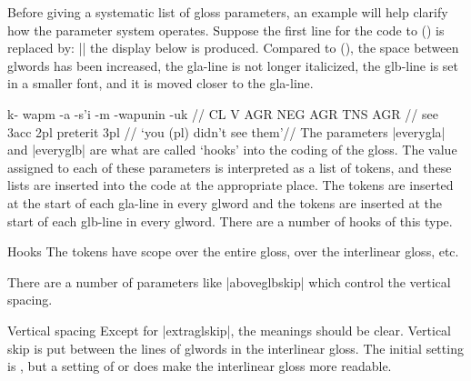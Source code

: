 Before giving a systematic list of gloss parameters, an example
will help clarify how the parameter system operates.  Suppose the
first line for the code to () is replaced by:
\medskip
\noindent |\ex[glspace=1.5em,everygla={},everyglb=\footnotesize,aboveglbskip=-.2ex]|
\medskip
\noindent the display below is produced.  Compared to
(), the space between glwords has been increased, the
gla-line is not longer italicized, the glb-line is set in
a smaller font, and it is moved closer to the gla-line.

\framedisplay
\ex[glspace=1.5em,everygla=,everyglb=\footnotesize,aboveglbskip=-.2ex]
\begingl
\gla k- wapm -a -s'i -m -wapunin -uk //
\glb CL V AGR NEG AGR TNS AGR //
 see {\sc 3acc} {} {\sc 2pl} preterit {\sc 3pl} //
\glft `you (pl) didn't see them'//
\endgl
\xe
\endframedisplay
The parameters |everygla| and |everyglb| are what are called `hooks'
into the coding of the gloss.  The value assigned to each of these
parameters is interpreted as a list of tokens, and these lists are
inserted into the code at the appropriate place.  The tokens
 are inserted at the start of each gla-line in
every glword and the tokens  are inserted at the
start of each glb-line in every glword.  There are a number of hooks
of this type.

\ex[dima=2em] Hooks
\smallskip
\quad
{}\xe
The tokens  have scope over the entire gloss,
 over the interlinear gloss, etc.

There are a number of parameters like |aboveglbskip| which control the
vertical spacing.

\ex[dima=2em] Vertical spacing
\smallskip
\quad
{}\xe
Except for |extraglskip|, the meanings should be clear.
Vertical skip  is put between the lines of
glwords in the interlinear gloss.  The initial setting is \textdim{0
pt}, but a setting of \textdim{.5 ex} or \textdim{1 ex} does make the
interlinear gloss more readable.

